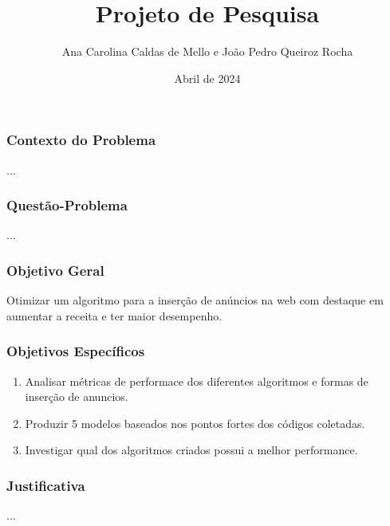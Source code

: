 \documentclass{beamer}
\title{Projeto de Pesquisa}
\author{Ana Carolina Caldas de Mello e João Pedro Queiroz Rocha}
\date{Abril de 2024}
\begin{document}
\maketitle

\begin{frame}
    \frametitle{Contexto do Problema}
    ...
\end{frame}

\begin{frame}
    \frametitle{Questão-Problema}
    ...
\end{frame}

\begin{frame}
    \frametitle{Objetivo Geral}
    Otimizar um algoritmo para a inserção de anúncios na web com destaque em aumentar a receita e ter maior desempenho.
\end{frame}

\begin{frame}
    \frametitle{Objetivos Específicos}
    \begin{enumerate}
       \item Analisar métricas de performace dos diferentes algoritmos e formas de inserção de anuncios.
       \item Produzir 5 modelos baseados nos pontos fortes dos códigos coletadas.
       \item Investigar qual dos algoritmos criados possui a melhor performance.
     \end{enumerate}
\end{frame}

\begin{frame}
    \frametitle{Justificativa}
    ...
\end{frame}
\end{document}
